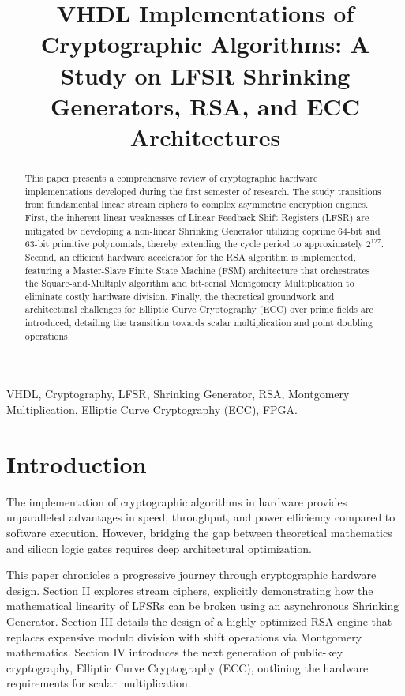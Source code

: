 \documentclass[conference, a4paper]{IEEEtran}
\begin{document}
\title{VHDL Implementations of Cryptographic Algorithms: A Study on LFSR Shrinking Generators, RSA, and ECC Architectures}

\author{
}

\maketitle

\begin{abstract}
This paper presents a comprehensive review of cryptographic hardware implementations developed during the first semester of research. The study transitions from fundamental linear stream ciphers to complex asymmetric encryption engines. First, the inherent linear weaknesses of Linear Feedback Shift Registers (LFSR) are mitigated by developing a non-linear Shrinking Generator utilizing coprime 64-bit and 63-bit primitive polynomials, thereby extending the cycle period to approximately $2^{127}$. Second, an efficient hardware accelerator for the RSA algorithm is implemented, featuring a Master-Slave Finite State Machine (FSM) architecture that orchestrates the Square-and-Multiply algorithm and bit-serial Montgomery Multiplication to eliminate costly hardware division. Finally, the theoretical groundwork and architectural challenges for Elliptic Curve Cryptography (ECC) over prime fields are introduced, detailing the transition towards scalar multiplication and point doubling operations.
\end{abstract}

\begin{IEEEkeywords}
VHDL, Cryptography, LFSR, Shrinking Generator, RSA, Montgomery Multiplication, Elliptic Curve Cryptography (ECC), FPGA.
\end{IEEEkeywords}

\section{Introduction}
The implementation of cryptographic algorithms in hardware provides unparalleled advantages in speed, throughput, and power efficiency compared to software execution. However, bridging the gap between theoretical mathematics and silicon logic gates requires deep architectural optimization. 

This paper chronicles a progressive journey through cryptographic hardware design. Section II explores stream ciphers, explicitly demonstrating how the mathematical linearity of LFSRs can be broken using an asynchronous Shrinking Generator. Section III details the design of a highly optimized RSA engine that replaces expensive modulo division with shift operations via Montgomery mathematics. Section IV introduces the next generation of public-key cryptography, Elliptic Curve Cryptography (ECC), outlining the hardware requirements for scalar multiplication.
\end{document}
